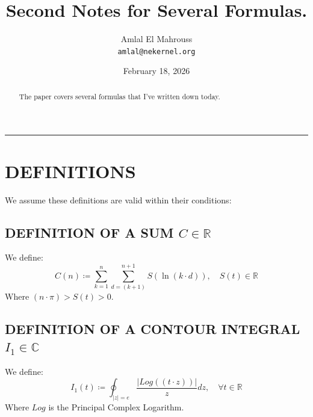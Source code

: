 \documentclass[11pt, a4paper]{article}
\title{Second Notes for Several Formulas.}
\author{Amlal El Mahrouss\\\texttt{amlal@nekernel.org}}
\date{February 18, 2026}
\begin{document}
\maketitle

\begin{center}
	\rule[0.01cm]{17cm}{0.01cm}
\end{center}

\begin{abstract}
\begin{center}
    The paper covers several formulas that I've written down today.
\end{center}
\end{abstract}

\section{DEFINITIONS}

We assume these definitions are valid within their conditions:

\subsection{DEFINITION OF A SUM $C \in \mathbb{R}$}
We define:
\begin{equation}
C(n) \coloneq \sum_{k=1}^{n} \sum_{d=(k+1)}^{n+1} S(\ln (k \cdot d)), \quad S(t) \in \mathbb{R}
\end{equation}
Where $(n\cdot \pi) > S(t) > 0$.

\subsection{DEFINITION OF A CONTOUR INTEGRAL $I_{1} \in \mathbb{C}$}
We define:
\begin{equation}
I_{1}(t) \coloneq \oint_{|z|=e} \frac{|Log((t\cdot z))|}{z}dz, \quad \forall t \in \mathbb{R}
\end{equation}
Where $Log$ is the Principal Complex Logarithm.
\end{document}
